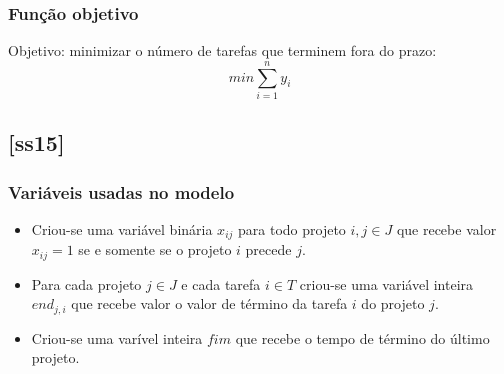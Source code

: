 \documentclass[11pt,letterpaper]{article}
\begin{document}
\subsubsection*{Função objetivo}
Objetivo: minimizar o número de tarefas que terminem fora do prazo:
\begin{equation}
min\sum_{i=1}^{n}y_i
\end{equation}

\subsection{{[}ss15{]}}
\subsubsection*{Variáveis usadas no modelo}
\begin{itemize}
\item Criou-se uma variável binária $x_{ij}$ para todo projeto $i, j
  \in J$ que recebe valor $x_{ij}=1$ se e somente se o projeto $i$ precede $j$.

\item Para cada projeto $j \in J$ e cada tarefa $i \in T$ criou-se uma variável inteira $end_{j,i}$
  que recebe valor o valor de término da tarefa $i$ do projeto $j$.

\item Criou-se uma varível inteira $fim$ que recebe o tempo de término
  do último projeto.

\end{itemize}
\end{document}
